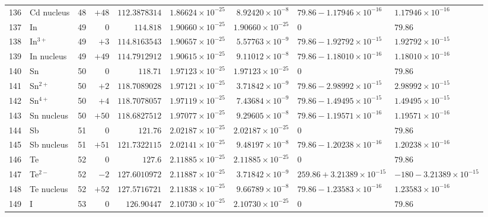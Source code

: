 {\begin{tabular}{@{}r l r r r r r l l@{}}
136 & Cd nucleus & 48 & $+48$ & $112.3878314$ & $1.86624{\times}10^{-25}$ & $8.92420{\times}10^{-8}$ & $79.86 - 1.17946{\times}10^{-16}$ & $1.17946{\times}10^{-16}$ \\
137 & In & 49 & $0$ & $114.818$ & $1.90660{\times}10^{-25}$ & $1.90660{\times}10^{-25}$ & $0$ & $79.86$ \\
138 & In$^{3+}$ & 49 & $+3$ & $114.8163543$ & $1.90657{\times}10^{-25}$ & $5.57763{\times}10^{-9}$ & $79.86 - 1.92792{\times}10^{-15}$ & $1.92792{\times}10^{-15}$ \\
139 & In nucleus & 49 & $+49$ & $114.7912912$ & $1.90615{\times}10^{-25}$ & $9.11012{\times}10^{-8}$ & $79.86 - 1.18010{\times}10^{-16}$ & $1.18010{\times}10^{-16}$ \\
140 & Sn & 50 & $0$ & $118.71$ & $1.97123{\times}10^{-25}$ & $1.97123{\times}10^{-25}$ & $0$ & $79.86$ \\
141 & Sn$^{2+}$ & 50 & $+2$ & $118.7089028$ & $1.97121{\times}10^{-25}$ & $3.71842{\times}10^{-9}$ & $79.86 - 2.98992{\times}10^{-15}$ & $2.98992{\times}10^{-15}$ \\
142 & Sn$^{4+}$ & 50 & $+4$ & $118.7078057$ & $1.97119{\times}10^{-25}$ & $7.43684{\times}10^{-9}$ & $79.86 - 1.49495{\times}10^{-15}$ & $1.49495{\times}10^{-15}$ \\
143 & Sn nucleus & 50 & $+50$ & $118.6827512$ & $1.97077{\times}10^{-25}$ & $9.29605{\times}10^{-8}$ & $79.86 - 1.19571{\times}10^{-16}$ & $1.19571{\times}10^{-16}$ \\
144 & Sb & 51 & $0$ & $121.76$ & $2.02187{\times}10^{-25}$ & $2.02187{\times}10^{-25}$ & $0$ & $79.86$ \\
145 & Sb nucleus & 51 & $+51$ & $121.7322115$ & $2.02141{\times}10^{-25}$ & $9.48197{\times}10^{-8}$ & $79.86 - 1.20238{\times}10^{-16}$ & $1.20238{\times}10^{-16}$ \\
146 & Te & 52 & $0$ & $127.6$ & $2.11885{\times}10^{-25}$ & $2.11885{\times}10^{-25}$ & $0$ & $79.86$ \\
147 & Te$^{2-}$ & 52 & $-2$ & $127.6010972$ & $2.11887{\times}10^{-25}$ & $3.71842{\times}10^{-9}$ & $259.86 + 3.21389{\times}10^{-15}$ & $-180 - 3.21389{\times}10^{-15}$ \\
148 & Te nucleus & 52 & $+52$ & $127.5716721$ & $2.11838{\times}10^{-25}$ & $9.66789{\times}10^{-8}$ & $79.86 - 1.23583{\times}10^{-16}$ & $1.23583{\times}10^{-16}$ \\
149 & I & 53 & $0$ & $126.90447$ & $2.10730{\times}10^{-25}$ & $2.10730{\times}10^{-25}$ & $0$ & $79.86$ \\

\end{tabular}}
